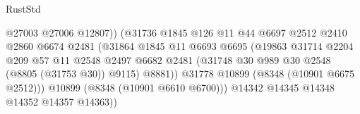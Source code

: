 \begin{lexlean}{RustStd}
\begin{coremodule}
                                                @27003
                                                @27006
                                                @12807))
                                            (@31736
                                              @1845
                                              @126
                                              @11
                                              @44
                                              @6697
                                              @2512
                                              @2410
                                              @2860
                                              @6674
                                              @2481
                                              (@31864
                                                @1845
                                                @11
                                                @6693
                                                @6695
                                                (@19863
                                                  @31714
                                                  @2204
                                                  @209
                                                  @57
                                                  @11
                                                  @2548
                                                  @2497
                                                  @6682
                                                  @2481
                                                  (@31748
                                                    @30
                                                    @989
                                                    @30
                                                    @2548
                                                    (@8805 (@31753 @30))
                                                    @9115)
                                                  @8881))
                                              @31778
                                              @10899
                                              (@8348 (@10901 @6675 @2512)))
                                            @10899
                                            (@8348 (@10901 @6610 @6700)))
                                          @14342
                                          @14345
                                          @14348
                                          @14352
                                          @14357
                                          @14363))

\end{coremodule}
\end{lexlean}
